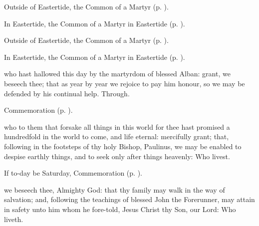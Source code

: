 \begin{rubric}
	Outside of Eastertide, the Common of a Martyr (p. \pageref{CommonMartyrBishopCollect}).
\end{rubric}

\begin{rubric}
	In Eastertide, the Common of a Martyr in Eastertide (p. \pageref{CommonMartyrBishopEasterCollect}).
\end{rubric}



\begin{rubric}
	Outside of Eastertide, the Common of a Martyr (p. \pageref{CommonMartyr}).
\end{rubric}

\begin{rubric}
	In Eastertide, the Common of a Martyr in Eastertide (p. \pageref{CommonMartyrEaster}).
\end{rubric}

{} who hast hallowed this day by the martyrdom of blessed Alban: grant, we beseech thee; that as year by year we rejoice to pay him honour, so we may be defended by his continual help. Through.

\begin{rubric}
	Commemoration  (p. \pageref{PaulinusCollect}).
\end{rubric}



\memorialCollect\label{PaulinusCollect}
 who to them that forsake all things in this world for thee hast promised a hundredfold in the world to come, and life eternal: mercifully grant; that, following in the footsteps of thy holy Bishop, Paulinus, we may be enabled to despise earthly things, and to seek only after things heavenly: Who livest.

\begin{rubric}
	If to-day be Saturday, Commemoration  (p. \pageref{JohnBaptistVigilCollect}).
\end{rubric}



\vigilCollect\label{JohnBaptistVigilCollect}
 we beseech thee, Almighty God: that thy family may walk in the way of salvation; and, following the teachings of blessed John the Forerunner, may attain in safety unto him whom he fore-told, Jesus Christ thy Son, our Lord: Who liveth.


